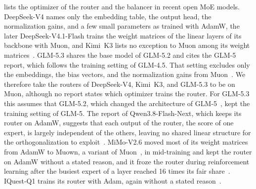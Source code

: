 \documentclass[11pt, a4paper]{article}
\begin{document}
 lists the optimizer of the router and the balancer in recent open MoE models. DeepSeek-V4 names only the embedding table, the output head, the normalization gains, and a few small parameters as trained with AdamW, the later DeepSeek-V4.1-Flash trains the weight matrices of the linear layers of its backbone with Muon, and Kimi~K3 lists no exception to Muon among its weight matrices~\citep{deepseek2026v4, deepseek2026v41flash, kimi2026k3}. GLM-5.3 shares the base model of GLM-5.2 and cites the GLM-5 report, which follows the training setting of GLM-4.5. That setting excludes only the embeddings, the bias vectors, and the normalization gains from Muon~\citep{zai2026glm53, glm2026glm5, glm2025glm45}. We therefore take the routers of DeepSeek-V4, Kimi~K3, and GLM-5.3 to be on Muon, although no report states which optimizer trains the router. For GLM-5.3 this assumes that GLM-5.2, which changed the architecture of GLM-5~\citep{zai2026glm52}, kept the training setting of GLM-5. The report of Qwen3.8-Flash-Next, which keeps its router on AdamW, suggests that each output of the router, the score of one expert, is largely independent of the others, leaving no shared linear structure for the orthogonalization to exploit~\citep{qiu2026qwennext}. MiMo-V2.6 moved most of its weight matrices from AdamW to Muown, a variant of Muon~\citep{lion2026muown}, in mid-training and kept the router on AdamW without a stated reason, and it froze the router during reinforcement learning after the busiest expert of a layer reached 16 times its fair share~\citep{xiaomi2026mimov26}. IQuest-Q1 trains its router with Adam, again without a stated reason~\citep{yang2026iquest}.
\end{document}
